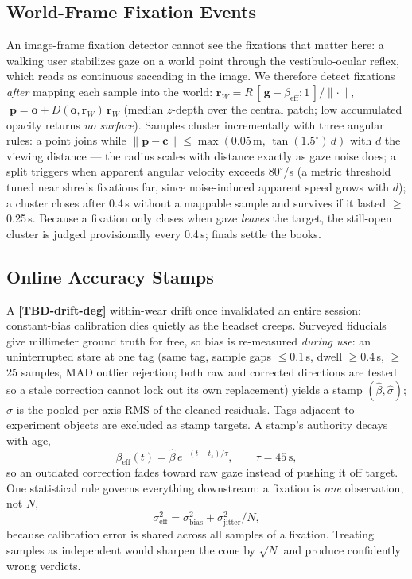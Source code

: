 \documentclass[letterpaper, 10 pt, conference]{ieeeconf}  %
\newcommand{\TBD}[1]{\textbf{\color{red}[TBD-#1]}}
\begin{document}
\subsection{World-Frame Fixation Events}
An image-frame fixation detector cannot see the fixations that matter
here: a walking user stabilizes gaze on a world point through the
vestibulo-ocular reflex, which reads as continuous saccading in the
image. We therefore detect fixations \emph{after} mapping each sample
into the world: $\mathbf{r}_W = R\,[\,\mathbf{g}-\beta_{\mathrm{eff}};
1\,]/\|\cdot\|$, $\;\mathbf{p} = \mathbf{o} +
D(\mathbf{o},\mathbf{r}_W)\,\mathbf{r}_W$ (median $z$-depth over the
central patch; low accumulated opacity returns \emph{no surface}).
Samples cluster incrementally with three angular rules: a point joins
while $\|\mathbf{p}-\mathbf{c}\| \le \max(0.05\,\mathrm{m},\,
\tan(1.5^\circ)\,d)$ with $d$ the viewing distance --- the radius
scales with distance exactly as gaze noise does; a split triggers
when apparent angular velocity exceeds $80^\circ$/s (a metric
threshold tuned near shreds fixations far, since noise-induced
apparent speed grows with $d$); a cluster closes after 0.4\,s without
a mappable sample and survives if it lasted $\ge$0.25\,s. Because a
fixation only closes when gaze \emph{leaves} the target, the still-open
cluster is judged provisionally every 0.4\,s; finals settle the books.

\subsection{Online Accuracy Stamps}
A \TBD{drift-deg} within-wear drift once invalidated an entire
session: constant-bias calibration dies quietly as the headset creeps.
Surveyed fiducials give millimeter ground truth for free, so bias is
re-measured \emph{during use}: an uninterrupted stare at one tag
(same tag, sample gaps $\le$0.1\,s, dwell $\ge$0.4\,s, $\ge$25
samples, MAD outlier rejection; both raw and corrected directions are
tested so a stale correction cannot lock out its own replacement)
yields a stamp $(\hat\beta, \hat\sigma)$; $\hat\sigma$ is the pooled
per-axis RMS of the cleaned residuals. Tags adjacent to experiment
objects are excluded as stamp targets. A stamp's authority decays
with age,
\begin{equation}
\beta_{\mathrm{eff}}(t) = \hat\beta\, e^{-(t - t_s)/\tau},
\qquad \tau = 45\,\mathrm{s},
\end{equation}
so an outdated correction fades toward raw gaze instead of pushing it
off target. One statistical rule governs everything downstream: a
fixation is \emph{one} observation, not $N$,
\begin{equation}
\sigma_{\mathrm{eff}}^2 = \sigma_{\mathrm{bias}}^2 +
\sigma_{\mathrm{jitter}}^2/N,
\end{equation}
because calibration error is shared across all samples of a fixation.
Treating samples as independent would sharpen the cone by $\sqrt{N}$
and produce confidently wrong verdicts.
\end{document}
